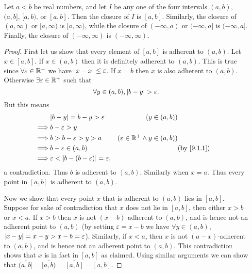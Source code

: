 \begin{lem}\label{9.1.12}
  Let \(a < b\) be real numbers, and let \(I\) be any one of the four intervals \((a, b)\), \((a, b]\), \([a, b)\), or \([a, b]\).
  Then the closure of \(I\) is \([a, b]\).
  Similarly, the closure of \((a, \infty)\) or \([a, \infty)\) is \([a, \infty)\), while the closure of \((-\infty, a)\) or \((-\infty, a]\) is \((-\infty, a]\).
  Finally, the closure of \((-\infty, \infty)\) is \((-\infty, \infty)\).
\end{lem}

\begin{proof}
  First let us show that every element of \([a, b]\) is adherent to \((a, b)\).
  Let \(x \in [a, b]\).
  If \(x \in (a, b)\) then it is definitely adherent to \((a, b)\).
  This is true since \(\forall \varepsilon \in \mathbb{R}^+\) we have \(\left\lvert x - x\right\rvert \leq \varepsilon\).
  If \(x = b\) then \(x\) is also adherent to \((a, b)\).
  Otherwise \(\exists \varepsilon \in \mathbb{R}^+\) such that
  \[
    \forall y \in (a, b), \left\lvert b - y\right\rvert > \varepsilon.
  \]
  But this means
  \begin{align*}
             & \abs{b - y} = b - y > \varepsilon                        & (y \in (a, b))                                         \\
    \implies & b - \varepsilon > y                                                                                               \\
    \implies & b > b - \varepsilon > y > a                              & (\varepsilon \in \R^+ \land y \in (a, b))              \\
    \implies & b - \varepsilon \in (a, b)                               &                                           & \by{9.1.1} \\
    \implies & \varepsilon < \abs{b - (b - \varepsilon)} = \varepsilon,
  \end{align*}
  a contradiction.
  Thus \(b\) is adherent to \((a, b)\).
  Similarly when \(x = a\).
  Thus every point in \([a, b]\) is adherent to \((a, b)\).

  Now we show that every point \(x\) that is adherent to \((a, b)\) lies in \([a, b]\).
  Suppose for sake of contradiction that \(x\) does not lie in \([a, b]\), then either \(x > b\) or \(x < a\).
  If \(x > b\) then \(x\) is not \((x - b)\)-adherent to \((a, b)\), and is hence not an adherent point to \((a, b)\)
  (by setting \(\varepsilon = x - b\) we have \(\forall y \in (a, b)\), \(\left\lvert x - y\right\rvert = x - y > x - b = \varepsilon\)).
  Similarly, if \(x < a\), then \(x\) is not \((a - x)\)-adherent to \((a, b)\), and is hence not an adherent point to \((a, b)\).
  This contradiction shows that \(x\) is in fact in \([a, b]\) as claimed.
  Using similar arguments we can show that \(\overline{(a, b]} = \overline{[a, b)} = \overline{[a, b]} = [a, b]\).


\end{proof}

